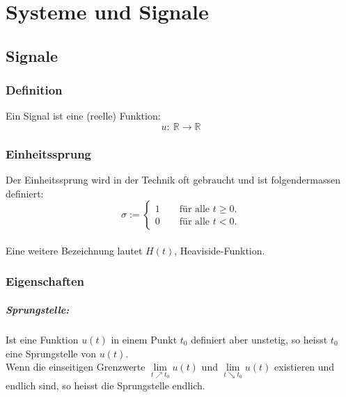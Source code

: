 



\chapter{Systeme und Signale}
\section{Signale}
\subsection{Definition}
Ein Signal ist eine (reelle) Funktion:
\[
	u:\ \mathbb{R} \rightarrow \mathbb{R}
\]


\subsection{Einheitssprung}
Der Einheitssprung wird in der Technik oft gebraucht und ist folgendermassen definiert:
\[
	\sigma := \left\lbrace 
		\begin{matrix}
			1 \qquad \text{für alle } t \ge 0.\\
			0 \qquad \text{für alle } t < 0.
		\end{matrix} \right.
\]
\\
Eine weitere Bezeichnung lautet $H(t)$, Heaviside-Funktion.


\subsection{Eigenschaften}
\paragraph{Sprungstelle:}
Ist eine Funktion $u(t)$ in einem Punkt $t_0$ definiert aber unstetig, so heisst $t_0$ eine Sprungstelle von $u(t)$.\\
Wenn die einseitigen Grenzwerte $\lim\limits_{t \nearrow t_0} u(t)$ und $\lim\limits_{t \searrow t_0} u(t)$ existieren und endlich sind, so heisst die Sprungstelle endlich.
